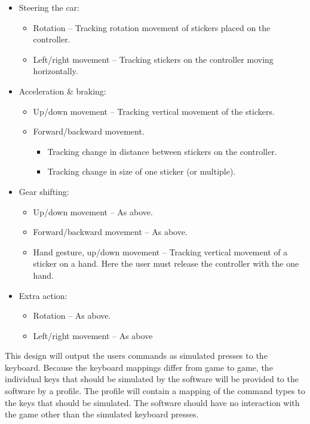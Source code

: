\begin{itemize}
	\item Steering the car:
	\begin{itemize}
		\item Rotation – Tracking rotation movement of stickers placed on the controller.
		\item Left/right movement – Tracking stickers on the controller moving horizontally.
	\end{itemize}
	
	\item Acceleration \& braking:
	\begin{itemize}
		\item Up/down movement – Tracking vertical movement of the stickers.
		\item Forward/backward movement.
		\begin{itemize}
			\item Tracking change in distance between stickers on the controller.
			\item Tracking change in size of one sticker (or multiple).
		\end{itemize}
	\end{itemize}
	
	\item Gear shifting:
	\begin{itemize}
		\item Up/down movement – As above.
		\item Forward/backward movement – As above.
		\item Hand gesture, up/down movement – Tracking vertical movement of a sticker on a hand. Here the user must release the controller with the one hand.
	\end{itemize}
	
	\item Extra action:
	\begin{itemize}
		\item Rotation – As above.
		\item Left/right movement – As above
	\end{itemize}
\end{itemize}
\bigskip

This design will output the users commands as simulated presses to the keyboard. 
Because the keyboard mappings differ from game to game, the individual keys that should be simulated by the software will be provided to the software by a profile.
The profile will contain a mapping of the command types to the keys that should be simulated. 
The software should have no interaction with the game other than the simulated keyboard presses.

